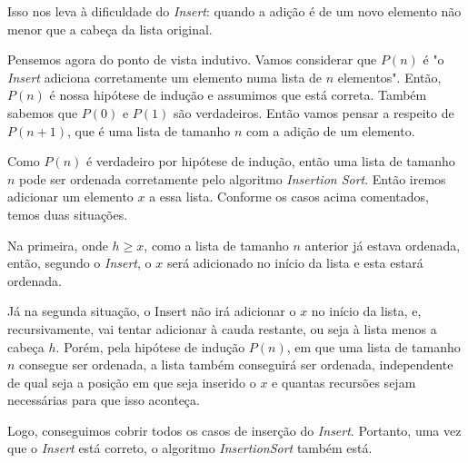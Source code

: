 \documentclass[a4paper, 10pt]{article}
\begin{document}
Isso nos leva à dificuldade do \textit{Insert}: quando a adição é de um novo elemento não menor que a cabeça da lista original. 

Pensemos agora do ponto de vista indutivo. Vamos considerar que $P(n)$ é "o \textit{Insert} adiciona corretamente um elemento numa lista de $n$ elementos". Então, $P(n)$ é nossa hipótese de indução e assumimos que está correta. Também sabemos que $P(0)$ e $P(1)$ são verdadeiros. Então vamos pensar a respeito de $P(n+1)$, que é uma lista de tamanho $n$ com a adição de um elemento.

Como $P(n)$ é verdadeiro por hipótese de indução, então uma lista de tamanho $n$ pode ser ordenada corretamente pelo algoritmo \textit{Insertion Sort}. Então iremos adicionar um elemento $x$ a essa lista. Conforme os casos acima comentados, temos duas situações.

Na primeira, onde $h \geq x$, como a lista de tamanho $n$ anterior já estava ordenada, então, segundo o \textit{Insert}, o $x$ será adicionado no início da lista e esta estará ordenada.

Já na segunda situação, o Insert não irá adicionar o $x$ no início da lista, e, recursivamente, vai tentar adicionar à cauda restante, ou seja à lista menos a cabeça $h$. Porém, pela hipótese de indução $P(n)$, em que uma lista de tamanho $n$ consegue ser ordenada, a lista também conseguirá ser ordenada, independente de qual seja a posição em que seja inserido o $x$ e quantas recursões sejam necessárias para que isso aconteça.

Logo, conseguimos cobrir todos os casos de inserção do \textit{Insert}. Portanto, uma vez que o \textit{Insert} está correto, o algoritmo \textit{InsertionSort} também está.

\end{document}
